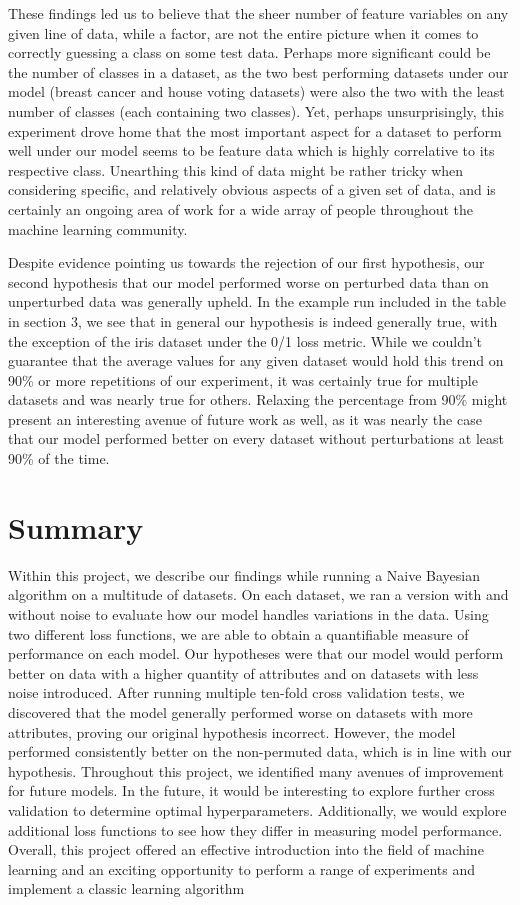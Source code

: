 \documentclass[twoside,11pt]{article}
\begin{document}
These findings led us to believe that the sheer number of feature variables on any given line of data, while a factor, are not the entire picture when it comes to correctly guessing a class on some test data.
Perhaps more significant could be the number of classes in a dataset, as the two best performing datasets under our model (breast cancer and house voting datasets) were also the two with the least number of 
classes (each containing two classes). Yet, perhaps unsurprisingly, this experiment drove home that the most important aspect for a dataset to perform well under our model seems to be feature data which is 
highly correlative to its  respective class. Unearthing this kind of data might be rather tricky when considering specific, and relatively obvious aspects of a given set of data, and is certainly an ongoing area of 
work for a wide array of people throughout the machine learning community.

Despite evidence pointing us towards the rejection of our first hypothesis, our second hypothesis that our model performed worse on perturbed data than on unperturbed data was generally upheld. In 
the example run included in the table in section 3, we see that in general our hypothesis is indeed generally true, with the exception of the iris dataset under the 0/1 loss metric. While we 
couldn't guarantee that the average values for any given dataset would hold this trend on 90\% or more repetitions of our experiment, it was certainly true for multiple datasets and was nearly true for others.
Relaxing the percentage from 90\% might present an interesting avenue of future work as well, as it was nearly the case that our model performed better on every dataset without perturbations at least 90\% of
the time.




\section{Summary}
Within this project, we describe our findings while running a Naive Bayesian algorithm on a multitude of datasets. On each dataset, we ran a version with and without noise to evaluate how our model handles variations in the data. Using two different loss functions, we are able to obtain a quantifiable measure of performance on each model. Our hypotheses were that our model would perform better on data with a higher quantity of attributes and on datasets with less noise introduced. After running multiple ten-fold cross validation tests, we discovered that the model generally performed worse on datasets with more attributes, proving our original hypothesis incorrect. However, the model performed consistently better on the non-permuted data, which is in line with our hypothesis. Throughout this project, we identified many avenues of improvement for future models. In the future, it would be interesting to explore further cross validation to determine optimal hyperparameters. Additionally, we would explore additional loss functions to see how they differ in measuring model performance. Overall, this project offered an effective introduction into the field of machine learning and an exciting opportunity to perform a range of experiments and implement a classic learning algorithm

\vskip 0.2in

\end{document}
